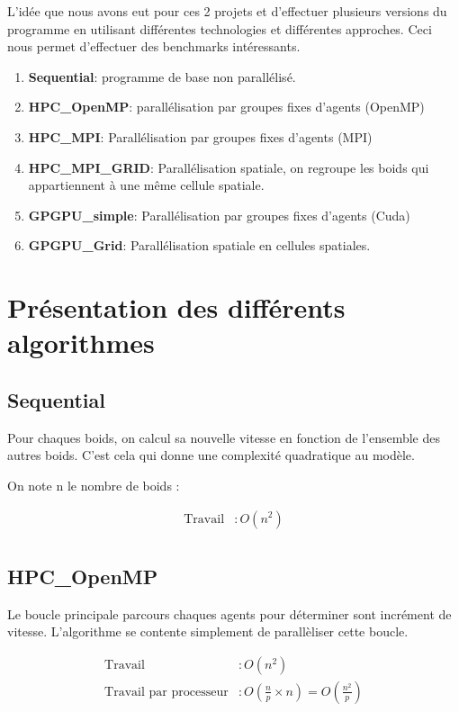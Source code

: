 \documentclass[liens,entete-ensimag,margeCorrection]{ensirapport}
\begin{document}
L'idée que nous avons eut pour ces 2 projets et d'effectuer plusieurs versions du programme en utilisant différentes technologies et différentes approches.
Ceci nous permet d'effectuer des benchmarks intéressants.

\begin{enumerate}
    \item \textbf{Sequential}: programme de base non parallélisé.
    \item \textbf{HPC\_OpenMP}: parallélisation par groupes fixes d'agents (OpenMP)
    \item \textbf{HPC\_MPI}: Parallélisation par groupes fixes d'agents (MPI)
    \item \textbf{HPC\_MPI\_GRID}: Parallélisation spatiale, on regroupe les boids qui appartiennent à une même cellule spatiale.
    \item \textbf{GPGPU\_simple}: Parallélisation par groupes fixes d'agents (Cuda)
    \item \textbf{GPGPU\_Grid}: Parallélisation spatiale en cellules spatiales.

\end{enumerate}


\section{Présentation des différents algorithmes}
\subsection{Sequential}

Pour chaques boids, on calcul sa nouvelle vitesse en fonction de l'ensemble des autres boids.
C'est cela qui donne une complexité quadratique au modèle.

On note n le nombre de boids :

\begin{align*}
    \text{Travail} &: O\left( n^2 \right)  \\
\end{align*}

\subsection{HPC\_OpenMP}
Le boucle principale parcours chaques agents pour déterminer sont incrément de vitesse.
L'algorithme se contente simplement de parallèliser cette boucle.

\begin{align*}
    \text{Travail} &: O\left( n^2 \right)  \\
    \text{Travail par processeur} &: O\left( \frac np \times n \right)  = O\left( \frac {n^2}p \right) \\
\end{align*}
\end{document}
